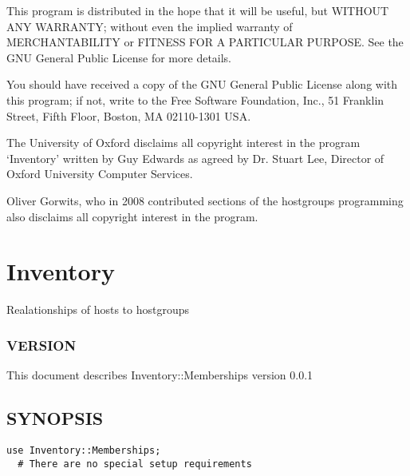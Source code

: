 \documentclass{book}
\begin{document}
This program is distributed in the hope that it will be useful, but WITHOUT ANY WARRANTY; without even the implied warranty of MERCHANTABILITY or FITNESS FOR A PARTICULAR PURPOSE. See the GNU General Public License for more details.



You should have received a copy of the GNU General Public License along with this program; if not, write to the Free Software Foundation, Inc., 51 Franklin Street, Fifth Floor, Boston, MA 02110-1301 USA.



The University of Oxford disclaims all copyright interest in the program `Inventory' written by Guy Edwards as agreed by Dr. Stuart Lee, Director of Oxford University Computer Services.



Oliver Gorwits, who in 2008 contributed sections of the hostgroups programming also disclaims all copyright interest in the program.




\section{Inventory}
\label{_Inventory::Memberships}
\hypertarget{_Inventory::Memberships}{}



Realationships of hosts to hostgroups


\subsubsection{VERSION}
\label{Inventory::Memberships_VERSION}
\hypertarget{Inventory::Memberships_VERSION}{}



This document describes Inventory::Memberships version 0.0.1


\subsection{SYNOPSIS}
\label{Inventory::Memberships_SYNOPSIS}
\hypertarget{Inventory::Memberships_SYNOPSIS}{}


\begin{Verbatim}[fontfamily=courier,gobble=1,frame=lines,fontsize=\small]
  use Inventory::Memberships;
  # There are no special setup requirements
\end{Verbatim}
\end{document}
